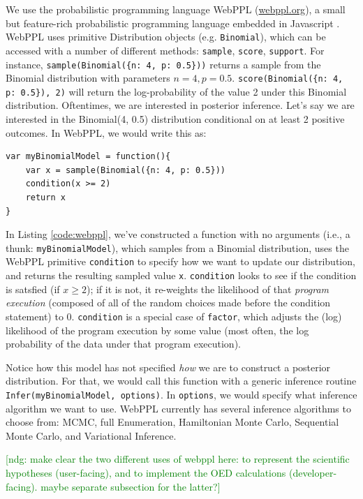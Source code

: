 \documentclass{article}
\newcommand{\ndg}[1]{\textcolor{Green}{[ndg: #1]}}
\begin{document}
We use the probabilistic programming language WebPPL (\url{webppl.org}), a small but feature-rich probabilistic programming language embedded in Javascript \cite{dippl}.
WebPPL uses primitive Distribution objects (e.g. \lstinline{Binomial}), which can be accessed with a number of different methods: \lstinline{sample}, \lstinline{score}, \lstinline{support}.
For instance, \lstinline|sample(Binomial({n: 4, p: 0.5}))| returns a sample from the Binomial distribution with parameters $n=4, p = 0.5$. \lstinline|score(Binomial({n: 4, p: 0.5}), 2)| will return the log-probability of the value 2 under this Binomial distribution.
Oftentimes, we are interested in posterior inference. Let's say we are interested in the Binomial(4, 0.5) distribution conditional on at least 2 positive outcomes. In WebPPL, we would write this as:
%
\begin{lstlisting}[mathescape, label={code:webppl}, caption = {Posterior inference in WebPPL.}]
var myBinomialModel = function(){
	var x = sample(Binomial({n: 4, p: 0.5}))
	condition(x >= 2)
	return x
}
\end{lstlisting}
%
In Listing \ref{code:webppl}, we've constructed a function with no arguments (i.e., a thunk: \lstinline{myBinomialModel}), which samples from a Binomial distribution, uses the WebPPL primitive \lstinline{condition} to specify how we want to update our distribution, and returns the resulting sampled value \lstinline{x}.
\lstinline{condition} looks to see if the condition is satsfied (if $x\geq2$); if it is not, it re-weights the likelihood of that \emph{program execution} (composed of all of the random choices made before the condition statement) to 0.
\lstinline{condition} is a special case of \lstinline{factor}, which adjusts the (log) likelihood of the program execution by some value (most often, the log probability of the data under that program execution).

Notice how this model has not specified \emph{how} we are to construct a posterior distribution. For that, we would call this function with a generic inference routine \lstinline{Infer(myBinomialModel, options)}. In \lstinline{options}, we would specify what inference algorithm we want to use. WebPPL currently has several inference algorithms to choose from: MCMC, full Enumeration, Hamiltonian Monte Carlo, Sequential Monte Carlo, and Variational Inference.

\ndg{make clear the two different uses of webppl here: to represent the scientific hypotheses (user-facing), and to implement the OED calculations (developer-facing). maybe separate subsection for the latter?}
\end{document}

